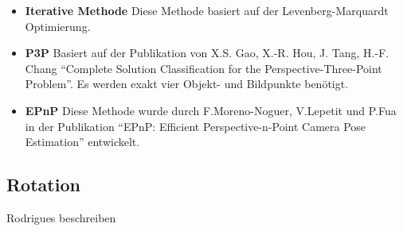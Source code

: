 \documentclass[main.tex]{subfiles}
\begin{document}
\begin{itemize}

\item \textbf{Iterative Methode}
Diese Methode basiert auf der Levenberg-Marquardt Optimierung.

\item \textbf{P3P}
Basiert auf der Publikation von X.S. Gao, X.-R. Hou, J. Tang, H.-F. Chang ``Complete Solution Classification for the Perspective-Three-Point Problem''. Es werden exakt vier Objekt- und Bildpunkte benötigt.

\item \textbf{EPnP}
Diese Methode wurde durch F.Moreno-Noguer, V.Lepetit und P.Fua in der Publikation ``EPnP: Efficient Perspective-n-Point Camera Pose Estimation'' entwickelt.

\end{itemize}

\subsection{Rotation}
Rodrigues beschreiben
\end{document}
